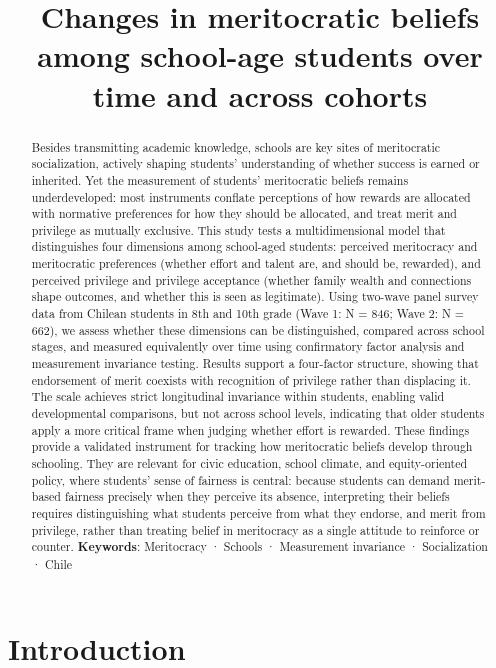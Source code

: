 \documentclass[
  13pt,
]{article}
\title{Changes in meritocratic beliefs among school-age students over
time and across cohorts}
\date{}
\begin{document}
\maketitle
\begin{abstract}
Besides transmitting academic knowledge, schools are key sites of
meritocratic socialization, actively shaping students' understanding of
whether success is earned or inherited. Yet the measurement of students'
meritocratic beliefs remains underdeveloped: most instruments conflate
perceptions of how rewards are allocated with normative preferences for
how they should be allocated, and treat merit and privilege as mutually
exclusive. This study tests a multidimensional model that distinguishes
four dimensions among school-aged students: perceived meritocracy and
meritocratic preferences (whether effort and talent are, and should be,
rewarded), and perceived privilege and privilege acceptance (whether
family wealth and connections shape outcomes, and whether this is seen
as legitimate). Using two-wave panel survey data from Chilean students
in 8th and 10th grade (Wave 1: N = 846; Wave 2: N = 662), we assess
whether these dimensions can be distinguished, compared across school
stages, and measured equivalently over time using confirmatory factor
analysis and measurement invariance testing. Results support a
four-factor structure, showing that endorsement of merit coexists with
recognition of privilege rather than displacing it. The scale achieves
strict longitudinal invariance within students, enabling valid
developmental comparisons, but not across school levels, indicating that
older students apply a more critical frame when judging whether effort
is rewarded. These findings provide a validated instrument for tracking
how meritocratic beliefs develop through schooling. They are relevant
for civic education, school climate, and equity-oriented policy, where
students' sense of fairness is central: because students can demand
merit-based fairness precisely when they perceive its absence,
interpreting their beliefs requires distinguishing what students
perceive from what they endorse, and merit from privilege, rather than
treating belief in meritocracy as a single attitude to reinforce or
counter. \newline \textbf{Keywords}: Meritocracy · Schools · Measurement
invariance · Socialization · Chile
\end{abstract}


\section{Introduction}\label{introduction}
\end{document}
